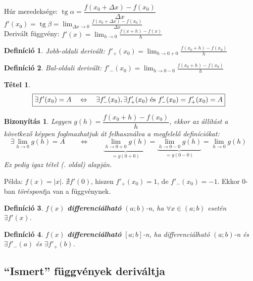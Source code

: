 \documentclass[a4paper,12pt,twoside]{book}
\DeclareMathOperator{\tg}{tg}
\newtheorem{tetel}{Tétel}[chapter]
\newtheorem{defi}{Definíció}[chapter]
\theoremstyle{break}
\newtheorem{biz}{Bizonyítás}[chapter]
\theoremstyle{plain}
\begin{document}
Húr meredeksége: $\tg \alpha = \dfrac{f(x_0+\Delta x)-f(x_0)}{\Delta x}$\\
$f'(x_0) = \tg \beta = \displaystyle \lim_{\Delta x\to 0} \frac{f(x_0+\Delta x)-f(x_0)}{\Delta x}$\\
Derivált függvény: $f'(x) = \displaystyle \lim_{h\to 0} \frac{f(x+h)-f(x)}{h}$\\

\vspace{80pt}

\begin{defi}
 Jobb-oldali derivált: $f'_+(x_0) = \displaystyle \lim_{h\to 0+0} \frac{f(x_0+h)-f(x_0)}{h}$
\end{defi}

\begin{defi}
 Bal-oldali derivált: $f'_-(x_0) = \displaystyle \lim_{h\to 0-0} \frac{f(x_0+h)-f(x_0)}{h}$
\end{defi}

\begin{tetel}
 \[\boxed{\exists f'(x_0) = A \quad \Leftrightarrow \quad \exists f'_-(x_0), \exists f'_+(x_0) \hbox{ és } f'_-(x_0)=f'_+(x_0)=A}\]
\end{tetel}
\begin{biz}
 Legyen $g(h) = \dfrac{f(x_0+h)-f(x_0)}{h}$, ekkor az állítást a következő képpen foglmazhatjuk át felhasználva a megfelelő definíciókat:
 \[\exists\lim_{h\to 0} g(h) = A \qquad \Leftrightarrow \qquad \underbrace{\lim_{h\to 0+0} g(h)}_{=g(0+0)}=\underbrace{\lim_{h\to 0-0} g(h)}_{=g(0-0)}=\lim_{h\to 0} g(h)\]
 Ez pedig igaz  tétel (\pageref{HatarertekJobbEsBal}. oldal) alapján.
\end{biz}
Példa: $f(x) = |x|$. $\nexists f'(0)$, hiszen $f'_+(x_0) = 1$, de $f'_-(x_0) = -1$. Ekkor 0-ban \emph{töréspont}ja van a függvénynek.

\begin{defi}
 $f(x)$ \textbf{differenciálható} $(a;b)$-n, ha $\forall x\in(a;b)$ esetén $\exists f'(x)$.
\end{defi}

\begin{defi}
 $f(x)$ \textbf{differenciálható} $[a;b]$-n, ha differenciálható $(a;b)$-n és $\exists f'_-(a)$ és $\exists f'_+(b)$.
\end{defi}

\subsection{``Ismert'' függvények deriváltja}
\end{document}
